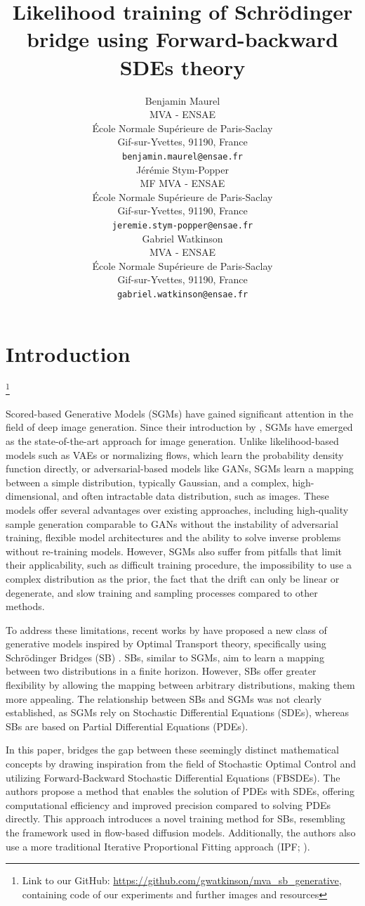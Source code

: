 \documentclass{article}
\title{Likelihood training of Schrödinger bridge using Forward-backward SDEs theory}
\author{%
  Benjamin Maurel\\
  MVA - ENSAE\\
  École Normale Supérieure de Paris-Saclay\\
  Gif-sur-Yvettes, 91190, France\\
  \texttt{benjamin.maurel@ensae.fr}\\
  \And
  Jérémie Stym-Popper\\MF
  MVA - ENSAE\\
  École Normale Supérieure de Paris-Saclay\\
  Gif-sur-Yvettes, 91190, France\\
  \texttt{jeremie.stym-popper@ensae.fr}\\
  \And
  Gabriel Watkinson\\
  MVA - ENSAE\\
  École Normale Supérieure de Paris-Saclay\\
  Gif-sur-Yvettes, 91190, France\\
  \texttt{gabriel.watkinson@ensae.fr}\\
}
\begin{document}
\maketitle


\section*{Introduction}

\let\thefootnote\relax\footnote{Link to our GitHub: \url{https://github.com/gwatkinson/mva_sb_generative}, containing code of our experiments and further images and resources}

Scored-based Generative Models (SGMs) have gained significant attention in the field of deep image generation.
Since their introduction by \citet{song2020score}, SGMs have emerged as the state-of-the-art approach for image generation.
Unlike likelihood-based models such as VAEs or normalizing flows, which learn the probability density function directly, or adversarial-based models like GANs,
SGMs learn a mapping between a simple distribution, typically Gaussian, and a complex, high-dimensional, and often intractable data distribution, such as images.
These models offer several advantages over existing approaches, including high-quality sample generation comparable to GANs without the instability of adversarial training, flexible model architectures and the ability to solve inverse problems without re-training models.
However, SGMs also suffer from pitfalls that limit their applicability, such as difficult training procedure, the impossibility to use a complex distribution as the prior, the fact that the drift can only be linear or degenerate, and slow training and sampling processes compared to other methods.

To address these limitations, recent works by \cite{debortoli2023diffusion, pmlr-v139-wang21l, vargas2021solving} have proposed a new class of generative models inspired by Optimal Transport theory, specifically using Schrödinger Bridges (SB) \cite{schrodinger1932theorie}.
SBs, similar to SGMs, aim to learn a mapping between two distributions in a finite horizon.
However, SBs offer greater flexibility by allowing the mapping between arbitrary distributions, making them more appealing.
The relationship between SBs and SGMs was not clearly established, as SGMs rely on Stochastic Differential Equations (SDEs), whereas SBs are based on Partial Differential Equations (PDEs).

In this paper, \cite{chen2023likelihood} bridges the gap between these seemingly distinct mathematical concepts by drawing inspiration from the field of Stochastic Optimal Control and utilizing Forward-Backward Stochastic Differential Equations (FBSDEs).
The authors propose a method that enables the solution of PDEs with SDEs, offering computational efficiency and improved precision compared to solving PDEs directly.
This approach introduces a novel training method for SBs, resembling the framework used in flow-based diffusion models.
Additionally, the authors also use a more traditional Iterative Proportional Fitting approach (IPF; \cite{kullback1968probability,debortoli2023diffusion}).
\end{document}
